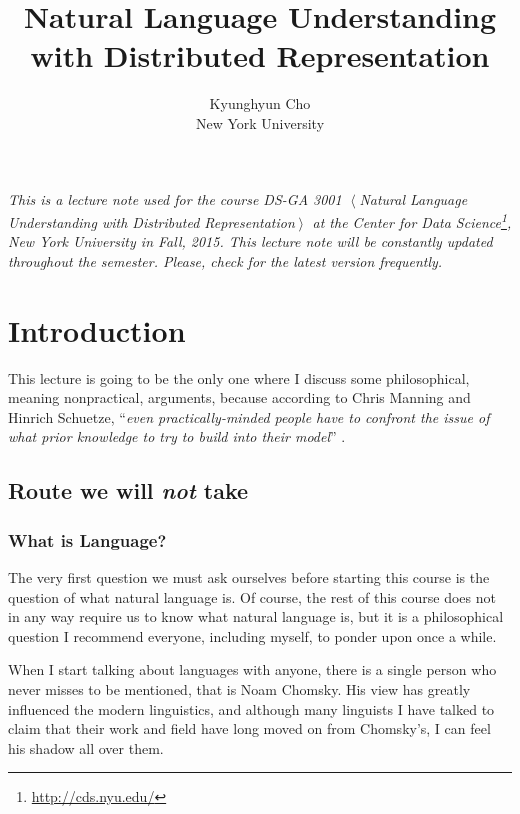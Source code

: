 \documentclass{report}
\begin{document}
\title{Natural Language Understanding with Distributed Representation}
\author{Kyunghyun Cho\\New York University}

\maketitle
{}

{\it 
    This is a lecture note used for the course DS-GA 3001 $\left<\right.$Natural
    Language Understanding with Distributed Representation$\left.\right>$ at the
    Center for Data Science\footnote{
        \url{http://cds.nyu.edu/}
    }, New York University in Fall, 2015.  This lecture
    note will be constantly updated throughout the semester. Please, check for
    the latest version frequently.
}

\tableofcontents



\chapter{Introduction}
\label{chap:intro}

This lecture is going to be the only one where I discuss some philosophical,
meaning nonpractical, arguments, because according to Chris Manning and Hinrich
Schuetze, ``{\it even practically-minded people have to confront the issue of
what prior knowledge to try to build into their model}''
\cite{manning1999foundations}. 

\section{Route we will {\it not} take}
\label{sec:wrong_route}

\subsection{What is Language?}

The very first question we must ask ourselves before starting this course is the
question of what natural language is. Of course, the rest of this course does
not in any way require us to know what natural language is, but it is a
philosophical question I recommend everyone, including myself, to ponder upon
once a while. 

When I start talking about languages with anyone, there is a single person who
never misses to be mentioned, that is Noam Chomsky. His view has greatly
influenced the modern linguistics, and although many linguists I have talked to
claim that their work and field have long moved on from Chomsky's, I can feel
his shadow all over them. 
\end{document}
